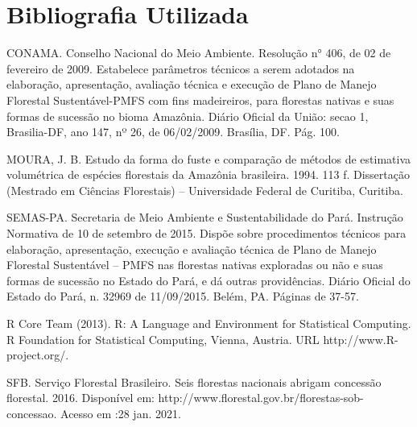 \documentclass[a4paper,12pt]{article}
\begin{document}
\section{Bibliografia Utilizada}

CONAMA. Conselho Nacional do Meio Ambiente. Resolução n° 406, de 02 de fevereiro de 2009. Estabelece parâmetros técnicos a serem adotados na elaboração, apresentação, avaliação técnica e execução de Plano de Manejo Florestal Sustentável-PMFS com fins madeireiros, para florestas nativas e suas formas de sucessão no bioma Amazônia. Diário Oficial da União: secao 1, Brasilia-DF, ano 147, nº 26, de 06/02/2009. Brasília, DF. Pág. 100.

MOURA, J. B. Estudo da forma do fuste e comparação de métodos de estimativa volumétrica de espécies florestais da Amazônia brasileira. 1994. 113 f. Dissertação (Mestrado em Ciências Florestais) – Universidade Federal de Curitiba, Curitiba.

SEMAS-PA. Secretaria de Meio Ambiente e Sustentabilidade do Pará.  Instrução Normativa de 10 de setembro de 2015. Dispõe sobre procedimentos técnicos para elaboração, apresentação, execução e avaliação técnica de Plano de Manejo Florestal Sustentável – PMFS nas florestas nativas exploradas ou não e suas formas de sucessão no Estado do Pará, e dá outras providências. Diário Oficial do Estado do Pará, n. 32969 de 11/09/2015. Belém, PA. Páginas de 37-57.

R Core Team (2013). R: A Language and Environment for Statistical Computing. R Foundation for Statistical Computing, Vienna, Austria. URL http://www.R-project.org/.

SFB. Serviço Florestal Brasileiro. Seis florestas nacionais abrigam concessão florestal. 2016. Disponível em: http://www.florestal.gov.br/florestas-sob-concessao. Acesso em :28 jan. 2021.
\end{document}
